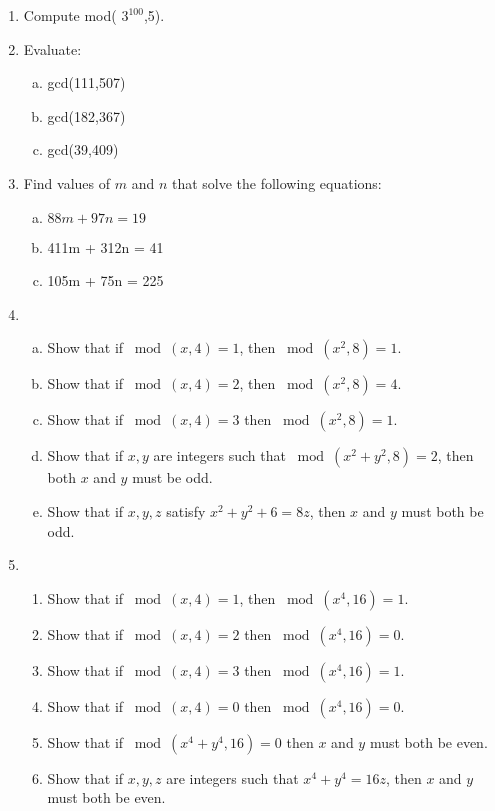 \begin{enumerate}
\item
Compute mod( $3^{100}$,5). 


\item
Evaluate: 
\begin{enumerate}[(a)]
\item
 gcd(111,507) 
\item
gcd(182,367) 
\item
gcd(39,409)
\end{enumerate}

\item
Find values of $m$ and $n$ that solve the following equations:
\begin{enumerate}[(a)]
\item
$88m + 97n = 19$
\item
 411m + 312n = 41 
\item
105m + 75n = 225
\end{enumerate}


\item
\begin{enumerate}[(a)]
\item
Show that if $\bmod(x,4)=1$, then $\bmod(x^2,8)=1$.
\item
Show that if $\bmod(x,4)=2$, then $\bmod(x^2,8) = 4$.
\item
Show that if $\bmod(x,4)=3$ then $\bmod(x^2,8) = 1$.
\item	
Show that if $x,y$  are integers such that $\bmod(x^2+y^2,8)=2$, then both $x$ and $y$ must be odd.
\item	
Show that if $x,y,z$ satisfy $x^2 + y^2 + 6 = 8z$, then $x$ and $y$ must both be odd.
\end{enumerate}

\item
\begin{enumerate}([a])	
\item
Show that if $\bmod(x,4)=1$, then $\bmod(x^4,16)=1$.
\item	
Show that if $\bmod(x,4)=2$ then $\bmod(x^4,16) = 0$.
\item	
Show that if $\bmod(x,4)=3$ then $\bmod(x^4,16) = 1$.
\item	
Show that if $\bmod(x,4)=0$ then $\bmod(x^4,16) = 0$.
\item
Show that if $\bmod(x^4+y^4,16) = 0$ then $x$ and $y$ must both be even.
\item	
Show that if $x,y, z$ are integers such that $x^4+y^4 = 16z$, then $x$ and $y$ must both be even.
\end{enumerate}

\end{enumerate}

